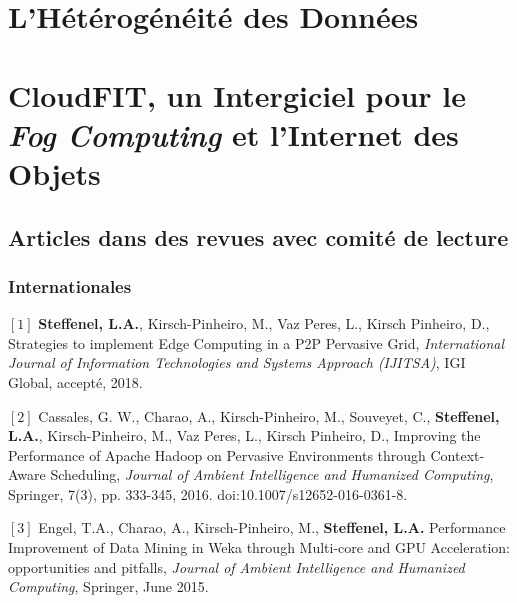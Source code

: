 \documentclass[final,twoside]{hdr} %
\begin{document}


\chapter{L'Hétérogénéité des Données\label{chap:grappes}}




\chapter{CloudFIT, un Intergiciel pour le \textit{Fog Computing} et l'Internet des Objets\label{chap:CloudFIT}}








\section*{Articles dans des revues avec comité de lecture}

\subsection*{Internationales}

\noindent $[1]$
{\bf Steffenel, L.A.}, Kirsch-Pinheiro, M., Vaz Peres, L., Kirsch Pinheiro, D.,
{Strategies to implement Edge Computing in a P2P Pervasive Grid},
{\em International Journal of Information Technologies and Systems Approach (IJITSA)}, IGI Global, accepté, 2018.

\vspace{1em} \noindent $[2]$
Cassales, G. W., Charao, A., Kirsch-Pinheiro, M., Souveyet, C., {\bf Steffenel, L.A.}, Kirsch-Pinheiro, M., Vaz Peres, L., Kirsch Pinheiro, D.,
{Improving the Performance of Apache Hadoop on Pervasive Environments through Context-Aware Scheduling},
{\em  Journal of Ambient Intelligence and Humanized Computing}, Springer, 7(3), pp. 333-345, 2016. doi:10.1007/s12652-016-0361-8.

\vspace{1em} \noindent $[3]$
Engel, T.A., Charao, A., Kirsch-Pinheiro, M., {\bf Steffenel, L.A.} {Performance Improvement of Data Mining in Weka through Multi-core and GPU Acceleration: opportunities and pitfalls}, {\em Journal of Ambient Intelligence and Humanized Computing}, Springer, June 2015. 
\end{document}
